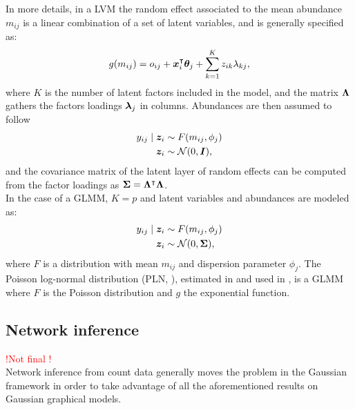 In more details, in a LVM the random effect associated to the mean abundance $m_{ij}$ is a linear combination of a set of latent variables, and is generally specified as:
 $$g(m_{ij}) = o_{ij}+{\boldsymbol{x}}_i^\intercal  {\boldsymbol{\theta}}_j +\sum_{k=1}^K z_{ik} \lambda_{kj},$$
 where $K$ is the number of latent factors included in the model, and the matrix ${\boldsymbol{\Lambda}}$ gathers the factors loadings ${\boldsymbol{\lambda}}_j$ in columns. Abundances are then assumed to follow
 \begin{align*}
 y_{ij}\mid {\boldsymbol{z}}_i &\sim F(m_{ij}, \phi_j)\\
{\boldsymbol{z}}_i&\sim \mathcal{N}(0, \boldsymbol{I}),
 \end{align*}
and the covariance matrix of the latent layer of random effects can be computed from the factor loadings as ${\boldsymbol{\Sigma}}={\boldsymbol{\Lambda}}^\intercal {\boldsymbol{\Lambda}}$.\\

In the case of a GLMM, $K=p$ and latent variables and abundances are  modeled as:
 \begin{align*}
 y_{ij}\mid {\boldsymbol{z}}_i &\sim F(m_{ij}, \phi_j)\\
 {\boldsymbol{z}}_i &\sim \mathcal{N}(0, {\boldsymbol{\Sigma}}),
 \end{align*} 
 where $F$ is a distribution with mean $m_{ij}$ and dispersion parameter $\phi_j$. The Poisson log-normal distribution (PLN, \citet{AiH89}), estimated in \citet{CMR18} and used in \citet{MRA20}, is a GLMM where $F$ is the Poisson distribution and $g$ the exponential function.  
 
 \subsection{Network inference}
 \textcolor{red}{!Not final !}\\
 Network inference from count data generally moves the problem in the Gaussian framework  in order to  take advantage of all the aforementioned results on Gaussian graphical models. \\
 
